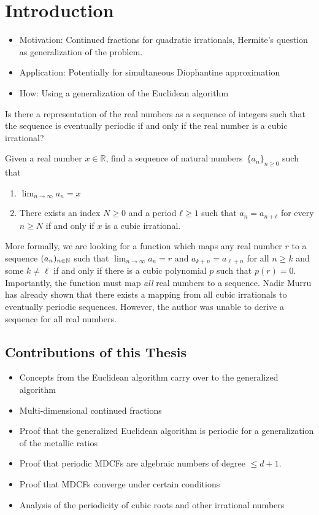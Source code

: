 \chapter{Introduction}
\label{ch:intro}

\begin{itemize}
  \item Motivation: Continued fractions for quadratic irrationals, Hermite's
    question as generalization of the problem.
  \item Application: Potentially for simultaneous Diophantine approximation
  \item How: Using a generalization of the Euclidean algorithm
\end{itemize}

Is there a representation of the real numbers as a sequence of integers such
that the sequence is eventually periodic if and only if the real number is a
cubic irrational?

\begin{problem}
  Given a real number $x ∈ ℝ$,
  find a sequence of natural numbers~$\{a_n\}_{n ≥ 0}$ such that
  \begin{enumerate}
    \item $\lim_{n → ∞} a_n = x$
    \item There exists an index $N ≥ 0$ and a period $ℓ ≥ 1$ such that $a_n = a_{n+ℓ}$
      for every $n ≥ N$ if and only if $x$ is a cubic irrational.
  \end{enumerate}
\end{problem}

More formally, we are looking for a function which maps any real number $r$ to
a sequence $(a_n)_{n \in {\mathbb N}}$ such that $\lim_{n → ∞} a_n = r$ and
$a_{k+n} = a_{\ell+n}$ for all $n \ge k$ and some $k \ne \ell$ if and only if there is a cubic polynomial $p$ such that $p(r) = 0$.
Importantly, the function must map \emph{all} real numbers to a sequence.
Nadir Murru \cite{Murru15} has already shown that there exists a mapping from all
cubic irrationals to eventually periodic sequences.
However, the author was unable to derive a sequence for all real numbers.

\section{Contributions of this Thesis}

\begin{itemize}
  \item Concepts from the Euclidean algorithm carry over to the generalized algorithm
  \item Multi-dimensional continued fractions
  \item Proof that the generalized Euclidean algorithm is periodic for a generalization of the metallic ratios
  \item Proof that periodic MDCFs are algebraic numbers of degree $≤ d+1$.
  \item Proof that MDCFs converge under certain conditions
  \item Analysis of the periodicity of cubic roots and other irrational numbers
\end{itemize}

